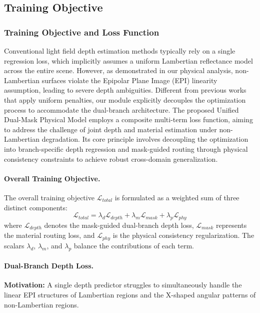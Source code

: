 \documentclass[lettersize,journal]{IEEEtran}
\begin{document}
\subsection{Training Objective}

\subsubsection{Training Objective and Loss Function}

Conventional light field depth estimation methods typically rely on a single regression loss, which implicitly assumes a uniform Lambertian reflectance model across the entire scene. However, as demonstrated in our physical analysis, non-Lambertian surfaces violate the Epipolar Plane Image (EPI) linearity assumption, leading to severe depth ambiguities. Different from previous works that apply uniform penalties, our module explicitly decouples the optimization process to accommodate the dual-branch architecture. The proposed Unified Dual-Mask Physical Model employs a composite multi-term loss function, aiming to address the challenge of joint depth and material estimation under non-Lambertian degradation. Its core principle involves decoupling the optimization into branch-specific depth regression and mask-guided routing through physical consistency constraints to achieve robust cross-domain generalization.

\paragraph{Overall Training Objective.}
The overall training objective $\mathcal{L}_{total}$ is formulated as a weighted sum of three distinct components:
\begin{equation}
\label{eq:eq23}
\mathcal{L}_{total} = \lambda_{d} \mathcal{L}_{depth} + \lambda_{m} \mathcal{L}_{mask} + \lambda_{p} \mathcal{L}_{phy}
\end{equation}
where $\mathcal{L}_{depth}$ denotes the mask-guided dual-branch depth loss, $\mathcal{L}_{mask}$ represents the material routing loss, and $\mathcal{L}_{phy}$ is the physical consistency regularization. The scalars $\lambda_{d}$, $\lambda_{m}$, and $\lambda_{p}$ balance the contributions of each term.

\paragraph{Dual-Branch Depth Loss.}
\textbf{Motivation:} A single depth predictor struggles to simultaneously handle the linear EPI structures of Lambertian regions and the X-shaped angular patterns of non-Lambertian regions. 
\end{document}
